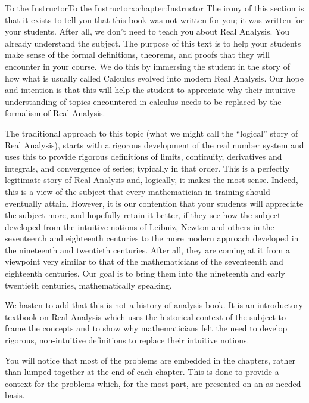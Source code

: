 \documentclass[oneside,10pt,]{book}
\numberwithin{equation}{section}
\begin{document}
\begin{chapterptx}{To the Instructor}{}{To the Instructor}{}{}{x:chapter:Instructor}
The irony of this section is that it exists to tell you that this book was not written for you; it was written for your students. After all, we don't need to teach you about Real Analysis. You already understand the subject. The purpose of this text is to help your students make sense of the formal definitions, theorems, and proofs that they will encounter in your course. We do this by immersing the student in the story of how what is usually called Calculus evolved into modern Real Analysis. Our hope and intention is that this will help the student to appreciate why their intuitive understanding of topics encountered in calculus needs to be replaced by the formalism of Real Analysis.%
\par
The traditional approach to this topic (what we might call the ``logical'' story of Real Analysis), starts with a rigorous development of the real number system and uses this to provide rigorous definitions of limits, continuity, derivatives and integrals, and convergence of series; typically in that order. This is a perfectly legitimate story of Real Analysis and, logically, it makes the most sense. Indeed, this is a view of the subject that every mathematician-in-training should eventually attain. However, it is our contention that your students will appreciate the subject more, and hopefully retain it better, if they see how the subject developed from the intuitive notions of Leibniz, Newton and others in the seventeenth and eighteenth centuries to the more modern approach developed in the nineteenth and twentieth centuries. After all, they are coming at it from a viewpoint very similar to that of the mathematicians of the seventeenth and eighteenth centuries. Our goal is to bring them into the nineteenth and early twentieth centuries, mathematically speaking.%
\par
We hasten to add that this is not a history of analysis book. It is an introductory textbook on Real Analysis which uses the historical context of the subject to frame the concepts and to show why mathematicians felt the need to develop rigorous, non-intuitive definitions to replace their intuitive notions.%
\par
You will notice that most of the problems are embedded in the chapters, rather than lumped together at the end of each chapter. This is done to provide a context for the problems which, for the most part, are presented on an as-needed basis.%
\par

\end{chapterptx}
\end{document}
